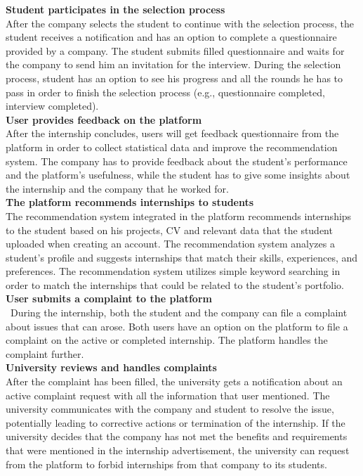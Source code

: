 \textbf{Student participates in the selection process}\\
After the company selects the student to continue with the selection process, the student receives a notification and has an option to complete a questionnaire provided by a company. The student submits filled questionnaire and waits for the company to send him an invitation for the interview. During the selection process, student has an option to see his progress and all the rounds he has to pass in order to finish the selection process (e.g., questionnaire completed, interview completed).\\

\textbf{User provides feedback on the platform}\\
After the internship concludes, users will get feedback questionnaire from the platform in order to collect statistical data and improve the recommendation system. The company has to provide feedback about the student’s performance and the platform’s usefulness, while the student has to give some insights about the internship and the company that he worked for.\\

\textbf{The platform recommends internships to students}\\
The recommendation system integrated in the platform recommends internships to the student based on his projects, CV and relevant data that the student uploaded when creating an account. The recommendation system analyzes a student’s profile and suggests internships that match their skills, experiences, and preferences. The recommendation system utilizes simple keyword searching in order to match the internships that could be related to the student's portfolio. \\

\textbf{User submits a complaint to the platform}\\\
During the internship, both the student and the company can file a complaint about issues that can arose. Both users have an option on the platform to file a complaint on the active or completed internship. The platform handles the complaint further. \\

\textbf{University reviews and handles complaints}\\
After the complaint has been filled, the university gets a notification about an active complaint request with all the information that user mentioned. The university communicates with the company and student to resolve the issue, potentially leading to corrective actions or termination of the internship. If the university decides that the company has not met the benefits and requirements that were mentioned in the internship advertisement, the university can request from the platform to forbid internships from that company to its students.\\

